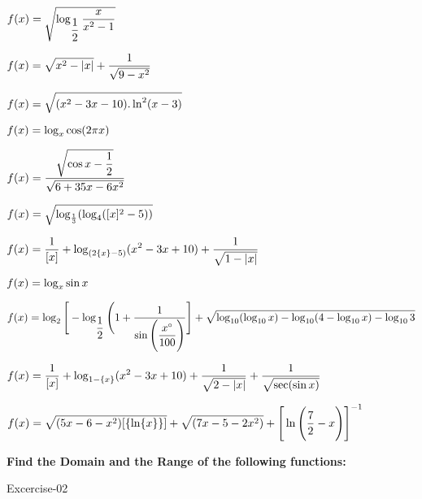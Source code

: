 \documentclass[addpoints]{exam}
\begin{document}
\begin{questions}
\question $\mathlarger{f(x)= \sqrt{\log_{\dfrac{1}{2}}\dfrac{x}{x^{2}-1}}}$

\question $\mathlarger{f(x)= \sqrt{x^2 -|x|} +\dfrac{1}{\sqrt{9-x^2}}}$

\question $\mathlarger{f(x)= \sqrt{(x^{2}-3x-10).\ln^{2}(x-3)}}$

\question $\mathlarger{f(x)= \log_{x}\cos(2\pi x)}$

\question $\mathlarger{f(x)= \dfrac{\sqrt{\cos x -\dfrac{1}{2}}}{\sqrt{6+35x-6x^{2}}}}$

\question $\mathlarger{f(x)= \sqrt{\log_{\frac{1}{3}} (\log_{4}([x]^{2}-5) )}}$

\question $\mathlarger{f(x)= \dfrac{1}{[x]} +\log_{(2\{x\}-5)}(x^{2}-3x+10) + \dfrac{1}{\sqrt{1-|x|}}}$

\question $\mathlarger{f(x)= \log_{x}\sin x }$

\question $\mathlarger{f(x)= \log_{2}\Bigg[-\log_{\dfrac{1}{2}} \Bigg(1+\dfrac{1}{\sin \Bigg(\dfrac{x^{\circ}}{100}\Bigg)} \Bigg] +\sqrt{\log_{10}(\log_{10}x) -\log_{10}(4-\log_{10}x) -\log_{10}3}}$

\question $\mathlarger{f(x)= \dfrac{1}{[x]} + \log_{1-\{x\}} (x^2 -3x +10) +\dfrac{1}{\sqrt{2-|x|}} +\dfrac{1}{\sqrt{\sec(\sin x)}}}$

\question $\mathlarger{f(x)= \sqrt{(5x-6-x^2)[\{\ln\{x\}\}]} +\sqrt{(7x-5-2x^{2})} +\Bigg[\ln\Bigg(\dfrac{7}{2}-x\Bigg) \Bigg]^{-1} }$

\end{questions}
\begin{center}
\begin{large}
 \textbf{ Find the Domain and the Range of the following functions:}
\end{large}
\begin{LARGE}
Excercise-02
\end{LARGE}
\end{center}
\end{document}
